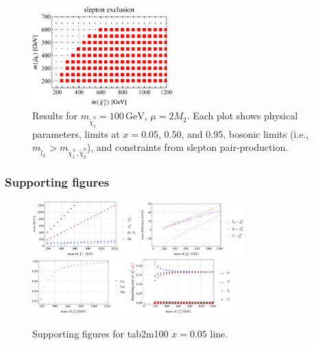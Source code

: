 \documentclass[a4paper,10pt,captions=tableheading,DIV=14]{scrartcl}
\numberwithin{equation}{section}
\newcommand\unit[1]{\,\mathrm{#1}\xspace}
\newcommand\GeV{\unit{GeV}}
\newcommand\neut  [1][\relax]{{\tilde\chi^0_{#1}}}
\newcommand\charPM[1][\relax]{{\tilde\chi^\pm_{#1}}}
\begin{document}
\begin{figure}[h!]
  \includegraphics[height=110pt]{../plots/plot_tab2m100slep_limit.pdf}
\caption{Results for $m_{\neut[1]}=100\GeV$, $\mu=2M_2$. Each plot shows physical parameters,  limits at $x=0.05$, 0.50, and 0.95, bosonic limits (i.e., $m_{\tilde l_L}>m_{\charPM[1],\neut[2]}$), and constraints from slepton pair-production.}
\end{figure}

\clearpage
\subsubsection{Supporting figures}
\begin{figure}[h!]\centering
 \includegraphics[height=60pt]{../plots/plot_tab2m100x005_mass.pdf}
 \includegraphics[height=60pt]{../plots/plot_tab2m100x005_massdiff.pdf}
 \includegraphics[height=60pt]{../plots/plot_tab2m100x005_cfactors.pdf}
 \includegraphics[height=60pt]{../plots/plot_tab2m100x005_br21.pdf}
\caption{Supporting figures for tab2m100 $x=0.05$ line.}
\end{figure}
\end{document}
